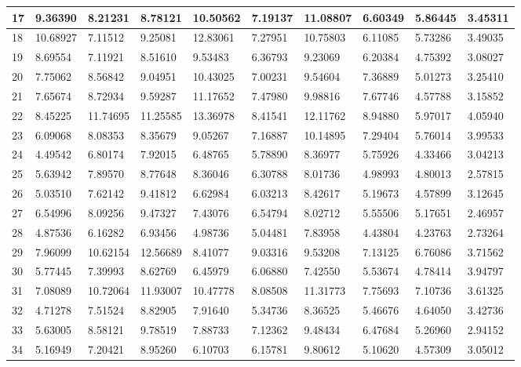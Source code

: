 \begin{table}[H]
{\begin{tabular}{|l|l|l|l|l|l|l|l|l|l|}
        17 & 9.36390 & 8.21231 & 8.78121 & 10.50562 & 7.19137 & 11.08807 & 6.60349 & 5.86445 & 3.45311 \\ \hline
        18 & 10.68927 & 7.11512 & 9.25081 & 12.83061 & 7.27951 & 10.75803 & 6.11085 & 5.73286 & 3.49035 \\ \hline
        19 & 8.69554 & 7.11921 & 8.51610 & 9.53483 & 6.36793 & 9.23069 & 6.20384 & 4.75392 & 3.08027 \\ \hline
        20 & 7.75062 & 8.56842 & 9.04951 & 10.43025 & 7.00231 & 9.54604 & 7.36889 & 5.01273 & 3.25410 \\ \hline
        21 & 7.65674 & 8.72934 & 9.59287 & 11.17652 & 7.47980 & 9.98816 & 7.67746 & 4.57788 & 3.15852 \\ \hline
        22 & 8.45225 & 11.74695 & 11.25585 & 13.36978 & 8.41541 & 12.11762 & 8.94880 & 5.97017 & 4.05940 \\ \hline
        23 & 6.09068 & 8.08353 & 8.35679 & 9.05267 & 7.16887 & 10.14895 & 7.29404 & 5.76014 & 3.99533 \\ \hline
        24 & 4.49542 & 6.80174 & 7.92015 & 6.48765 & 5.78890 & 8.36977 & 5.75926 & 4.33466 & 3.04213 \\ \hline
        25 & 5.63942 & 7.89570 & 8.77648 & 8.36046 & 6.30788 & 8.01736 & 4.98993 & 4.80013 & 2.57815 \\ \hline
        26 & 5.03510 & 7.62142 & 9.41812 & 6.62984 & 6.03213 & 8.42617 & 5.19673 & 4.57899 & 3.12645 \\ \hline
        27 & 6.54996 & 8.09256 & 9.47327 & 7.43076 & 6.54794 & 8.02712 & 5.55506 & 5.17651 & 2.46957 \\ \hline
        28 & 4.87536 & 6.16282 & 6.93456 & 4.98736 & 5.04481 & 7.83958 & 4.43804 & 4.23763 & 2.73264 \\ \hline
        29 & 7.96099 & 10.62154 & 12.56689 & 8.41077 & 9.03316 & 9.53208 & 7.13125 & 6.76086 & 3.71562 \\ \hline
        30 & 5.77445 & 7.39993 & 8.62769 & 6.45979 & 6.06880 & 7.42550 & 5.53674 & 4.78414 & 3.94797 \\ \hline
        31 & 7.08089 & 10.72064 & 11.93007 & 10.47778 & 8.08508 & 11.31773 & 7.75693 & 7.10736 & 3.61325 \\ \hline
        32 & 4.71278 & 7.51524 & 8.82905 & 7.91640 & 5.34736 & 8.36525 & 5.46676 & 4.64050 & 3.42736 \\ \hline
        33 & 5.63005 & 8.58121 & 9.78519 & 7.88733 & 7.12362 & 9.48434 & 6.47684 & 5.26960 & 2.94152 \\ \hline
        34 & 5.16949 & 7.20421 & 8.95260 & 6.10703 & 6.15781 & 9.80612 & 5.10620 & 4.57309 & 3.05012 \\ \hline

\end{tabular}}
\end{table}
